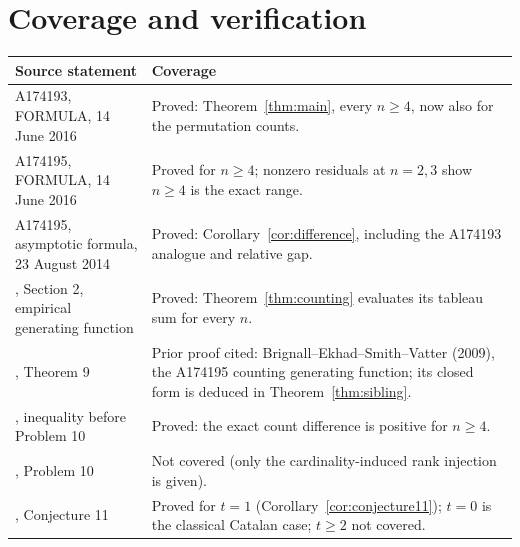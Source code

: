 \documentclass[10pt]{article}
\begin{document}
\section{Coverage and verification}
\begin{center}\small
\begin{tabular}{p{.40\linewidth}p{.52\linewidth}}
\toprule
Source statement & Coverage\\\midrule
A174193, FORMULA, 14 June 2016 & Proved: Theorem~\ref{thm:main}, every $n\geq4$, now also for the permutation counts.\\
A174195, FORMULA, 14 June 2016 & Proved for $n\geq4$; nonzero residuals at $n=2,3$ show $n\geq4$ is the exact range.\\
A174195, asymptotic formula, 23 August 2014 & Proved: Corollary~\ref{cor:difference}, including the A174193 analogue and relative gap.\\
\cite{almost}, Section 2, empirical generating function & Proved: Theorem~\ref{thm:counting} evaluates its tableau sum for every $n$.\\
\cite{almost}, Theorem 9 & Prior proof cited: Brignall--Ekhad--Smith--Vatter (2009), the A174195 counting generating function; its closed form is deduced in Theorem~\ref{thm:sibling}.\\
\cite{almost}, inequality before Problem 10 & Proved: the exact count difference is positive for $n\geq4$.\\
\cite{almost}, Problem 10 & Not covered (only the cardinality-induced rank injection is given).\\
\cite{almost}, Conjecture 11 & Proved for $t=1$ (Corollary~\ref{cor:conjecture11}); $t=0$ is the classical Catalan case; $t\geq2$ not covered.\\
\bottomrule
\end{tabular}
\end{center}
\end{document}
